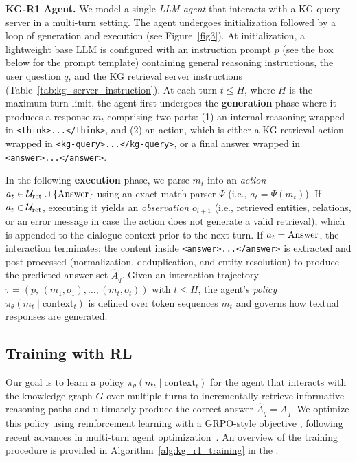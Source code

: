 \noindent\textbf{\textsc{KG-R1} Agent.} 
We model a single \emph{LLM agent} that interacts with a KG query server in a multi-turn setting. The agent undergoes initialization followed by a loop of generation and execution (see Figure~\ref{fig3}). At initialization, a lightweight base LLM is configured with an instruction prompt \(p\) (see the box below for the prompt template) containing general reasoning instructions, the user question \(q\), and the KG retrieval server instructions (Table~\ref{tab:kg_server_instruction}). At each turn \(t \le H\), where $H$ is the maximum turn limit, the agent first undergoes the \textbf{generation} phase where it produces a response \(m_t\) comprising two parts: (1) an internal reasoning wrapped in \texttt{<think>...</think>}, and (2) an action, which is either a KG retrieval action wrapped in \texttt{<kg-query>...</kg-query>}, or a final answer wrapped in \texttt{<answer>...</answer>}. 



In the following \textbf{execution} phase, we parse \(m_t\) into an \emph{action} \(a_t \in \mathcal{U}_{\text{ret}} \cup \{\operatorname{Answer}\}\) using an exact-match parser \(\Psi\) (i.e., \(a_t=\Psi(m_t)\)). If \(a_t \in \mathcal{U}_{\text{ret}}\), executing it yields an \emph{observation} \(o_{t+1}\) (i.e., retrieved entities, relations, or an error message in case the action does not generate a valid retrieval), which is appended to the dialogue context prior to the next turn. If \(a_t=\operatorname{Answer}\), the interaction terminates: the content inside \texttt{<answer>...</answer>} is extracted and post-processed (normalization, deduplication, and entity resolution) to produce the predicted answer set \(\hat{A}_q\). Given an interaction trajectory $\tau = (p,\,(m_1,o_1),\ldots,(m_t,o_{t}))$ with $t \leq H$, the \framework{} agent’s \emph{policy} \(\pi_\theta(m_t \mid \text{context}_t)\) is defined over token sequences \(m_t\) and governs how textual responses are generated. 

\subsection{\framework{} Training with RL}
\label{sub:kg_r1_rl}

Our goal is to learn a policy \(\pi_\theta(m_t \mid \text{context}_t)\) for the \framework{} agent that interacts with the knowledge graph $G$ over multiple turns to incrementally retrieve informative reasoning paths and ultimately produce the correct answer \(\hat{A}_q =  A_q\). We optimize this policy using reinforcement learning with a GRPO-style objective \citep{DeepSeek2025R1}, following recent advances in multi-turn agent optimization~\citep{qian2025toolrl, jin2025searchr1, zeng2025reinforcing}. An overview of the training procedure is provided in Algorithm~\ref{alg:kg_r1_training} in the . %

